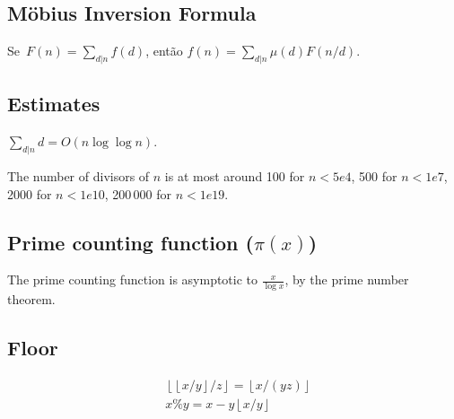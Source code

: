     \subsection{Möbius Inversion Formula}
        Se~$F(n) = \sum\limits_{d | n}{f(d)}$, então
        $f(n) = \sum\limits_{d | n}{\mu(d) F(n / d)}.$\newline
        
\subsection{Estimates}
	$\sum_{d|n} d = O(n \log \log n)$.

	The number of divisors of $n$ is at most around 100 for $n < 5e4$, 500 for $n < 1e7$, 2000 for $n < 1e10$, 200\,000 for $n < 1e19$.
	
 \subsection{Prime counting function ($\pi(x)$)} The prime counting function is asymptotic to $\frac{x}{\log x}$, by the prime number theorem.

      

\subsection{Floor}
            \begin{align*}
                &\left\lfloor \left\lfloor x/y \right\rfloor / z \right\rfloor = \left\lfloor x / (yz) \right\rfloor \\
                &x \% y = x - y \left\lfloor x / y \right\rfloor
            \end{align*}
